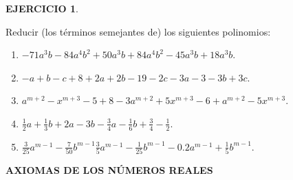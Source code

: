 \documentclass[12pt,letterpaper]{article}
\theoremstyle{definition}
\newtheorem{ejer}{EJERCICIO}
\begin{document}
\vspace{3mm}

\begin{ejer}\

Reducir (los términos semejantes de) los siguientes polinomios:
\begin{enumerate}
\setlength{\itemindent}{+.5in}
\item $-71a^3b-84a^4b^2+50a^3b+84a^4b^2-45a^3b+18a^3b$.
\item $-a+b-c+8+2a+2b-19-2c-3a-3-3b+3c$. %
\item $a^{m+2}-x^{m+3}-5+8-3a^{m+2}+5x^{m+3}-6+a^{m+2}-5x^{m+3}$. %
\item $\frac{1}{2}a+\frac{1}{3}b+2a-3b-\frac{3}{4}a-\frac{1}{6}b+\frac{3}{4}-\frac{1}{2}$. %
\item $\frac{3}{25}a^{m-1}-\frac{7}{50}b^{m-1} \frac{3}{5}a^{m-1} -\frac{1}{25}b^{m-1}-0.2a^{m-1}+\frac{1}{5}b^{m-1}$. %
\end{enumerate}

\end{ejer}

\pagebreak



\textbf{AXIOMAS DE LOS NÚMEROS REALES}  %
\end{document}
